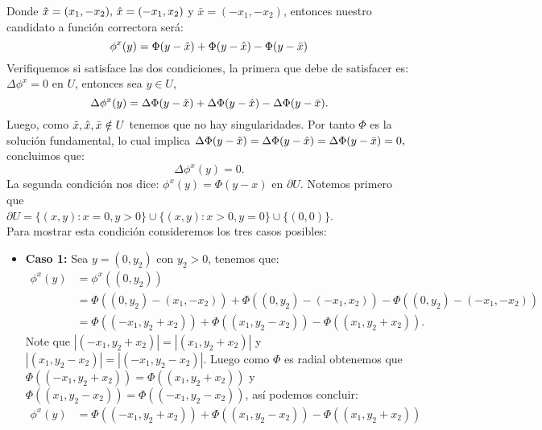 \documentclass{article}
\begin{document}
\begin{homeworkProblem}[6]
\begin{solucion}
\begin{center}
    \end{center}
   Donde $\Tilde{x}=(x_1,-x_2),\,\hat{x}=(-x_1,x_2)$ y $\bar{x}=(-x_1,-x_2)$, entonces nuestro candidato a función correctora será:
   $$\phi^x(y)=\Phi(y-\Tilde{x})+\Phi(y-\hat{x})-\Phi(y-\bar{x})$$
   Verifiquemos si satisface las dos condiciones, la primera que debe de satisfacer es: $\Delta\phi^x=0$ en $U$, entonces sea $y\in U$,
   $$\Delta\phi^x(y)=\Delta\Phi(y-\Tilde{x})+\Delta\Phi(y-\hat{x})-\Delta\Phi(y-\bar{x}).$$
   Luego, como $\Tilde{x},\hat{x},\bar{x}\notin U$ tenemos que no hay singularidades. Por tanto $\Phi$ es la solución fundamental, lo cual implica $\Delta\Phi(y-\Tilde{x})=\Delta\Phi(y-\hat{x})=\Delta\Phi(y-\bar{x})=0,$ concluimos que:
   $$\Delta\phi^x(y)=0.$$
   La segunda condición nos dice: $\phi^x(y)=\Phi(y-x)$ en $\partial U.$ Notemos primero que\\ $\partial U=\{(x,y):x=0,y>0\}\cup\{(x,y):x>0,y=0\}\cup\{(0,0)\}$.\\ Para mostrar esta condición consideremos los tres casos posibles:
   \begin{itemize}
       \item \textbf{Caso 1: }Sea $y=(0,y_2)$ con $y_2>0$, tenemos que:
       \begin{align*}
           \phi^x(y)&=\phi^x((0,y_2))\\
           &=\Phi((0,y_2)-(x_1,-x_2))+\Phi((0,y_2)-(-x_1,x_2))-\Phi((0,y_2)-(-x_1,-x_2))\\
           &=\Phi((-x_1,y_2+x_2))+\Phi((x_1,y_2-x_2))-\Phi((x_1,y_2+x_2)).
       \end{align*}
        Note que $|(-x_1,y_2+x_2)|=|(x_1,y_2+x_2)|$ y $|(x_1,y_2-x_2)|=|(-x_1,y_2-x_2)|$. Luego como $\Phi$ es radial obtenemos que $\Phi((-x_1,y_2+x_2))=\Phi((x_1,y_2+x_2))$ y $\Phi((x_1,y_2-x_2))=\Phi((-x_1,y_2-x_2))$, así podemos concluir:
       \begin{align*}
        \phi^x(y)&=\Phi((-x_1,y_2+x_2))+\Phi((x_1,y_2-x_2))-\Phi((x_1,y_2+x_2))\\

\end{align*}
\end{itemize}
\end{solucion}
\end{homeworkProblem}
\end{document}
